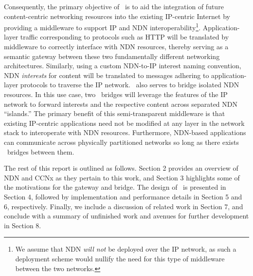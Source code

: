 Consequently, the primary objective of \sink\ is to aid the integration of future content-centric networking resources into the existing IP-centric Internet by providing a middleware to support IP and NDN interoperability\footnote{We assume that NDN \emph{will not} be deployed over the IP network, as such a deployment scheme would nullify the need for this type of middleware between the two networks.}. Application-layer traffic corresponding to protocols such as HTTP will be translated by middleware to correctly interface with NDN resources, thereby serving as a semantic gateway between these two fundamentally different networking architectures. Similarly, using a custom NDN-to-IP interest naming convention, NDN \emph{interests} for content will be translated to messages adhering to application-layer protocols to traverse the IP network. \sink\ also serves to bridge isolated NDN resources. In this use case, two \sink\ bridges will leverage the features of the IP network to forward interests and the respective content across separated NDN ``islands.'' The primary benefit of this semi-transparent middleware is that existing IP-centric applications need not be modified at any layer in the network stack to interoperate with NDN resources. Furthermore, NDN-based applications can communicate across physically partitioned networks so long as there exists \sink\ bridges between them. 

The rest of this report is outlined as follows. Section 2 provides an overview of NDN and CCNx as they pertain to this work, and Section 3 highlights some of the motivations for the gateway and bridge. The design of \sink\ is presented in Section 4, followed by implementation and performance details in Section 5 and 6, respectively. Finally, we include a discussion of related work in Section 7, and conclude with a summary of unfinished work and avenues for further development in Section 8. 





